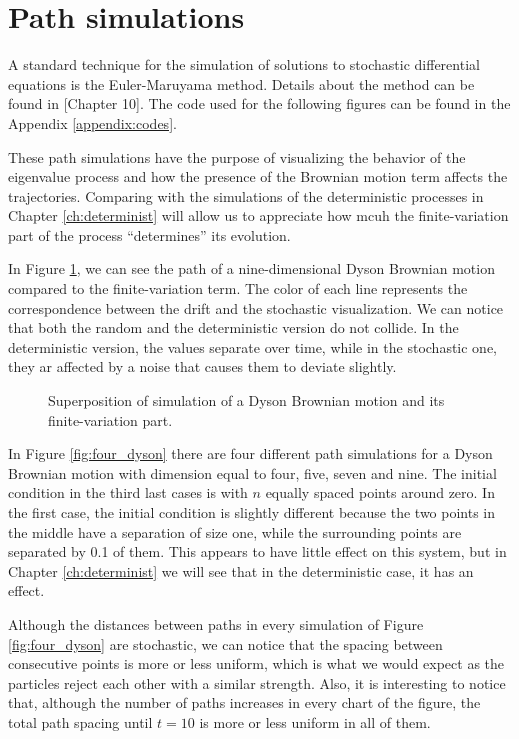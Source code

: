 \section{Path simulations}

A standard technique for the simulation of solutions to stochastic differential equations is the Euler-Maruyama method. Details about the method can be found in \cite{book:asmussen}[Chapter 10]. The code used for the following figures can be found in the Appendix \ref{appendix:codes}. 

These path simulations have the purpose of visualizing the behavior of the eigenvalue process and how the presence of the Brownian motion term affects the trajectories. Comparing with the simulations of the deterministic processes in Chapter \ref{ch:determinist} will allow us to appreciate how mcuh the finite-variation part of the process ``determines'' its evolution.

In Figure \ref{fig:dyson_comparison}, we can see the path of a nine-dimensional Dyson Brownian motion compared to the finite-variation term. The color of each line represents the correspondence between the drift and the stochastic visualization. We can notice that both the random and the deterministic version do not collide. In the deterministic version, the values separate over time, while in the stochastic one, they ar affected by a noise that causes them to deviate slightly.

\begin{figure}[h!] 
    
    \caption{Superposition of simulation of a Dyson Brownian motion and its finite-variation part.\label{fig:dyson_comparison}}
\end{figure}

In Figure \ref{fig:four_dyson} there are four different path simulations for a Dyson Brownian motion with dimension equal to four, five, seven and nine. The initial condition in the third last cases is with $n$ equally spaced points around zero. In the first case, the initial condition is slightly different because the two points in the middle have a separation of size one, while the surrounding points are separated by 0.1 of them. This appears to have little effect on this system, but in Chapter \ref{ch:determinist} we will see that in the deterministic case, it has an effect.

Although the distances between paths in every simulation of Figure \ref{fig:four_dyson} are stochastic, we can notice that the spacing between consecutive points is more or less uniform, which is what we would expect as the particles reject each other with a similar strength. Also, it is interesting to notice that, although the number of paths increases in every chart of the figure, the total path spacing until $t=10$ is more or less uniform in all of them. 

